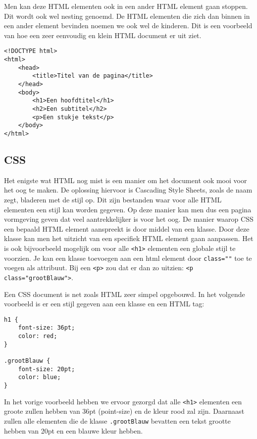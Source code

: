 Men kan deze HTML elementen ook in een ander HTML element gaan stoppen. Dit wordt ook wel nesting genoemd. De HTML elementen die zich dan binnen in een ander element bevinden noemen we ook wel de kinderen. Dit is een voorbeeld van hoe een zeer eenvoudig en klein HTML document er uit ziet.

\begin{lstlisting}[frame=single, caption=Voorbeeld van een HTML bestand]
<!DOCTYPE html>
<html>
	<head>
		<title>Titel van de pagina</title>
	</head>
	<body>
		<h1>Een hoofdtitel</h1>
		<h2>Een subtitel</h2>
		<p>Een stukje tekst</p>
	</body>
</html>
\end{lstlisting}

\subsection{CSS}
Het enigste wat HTML nog mist is een manier om het document ook mooi voor het oog te maken. De oplossing hiervoor is Cascading Style Sheets, zoals de naam zegt, bladeren met de stijl op. Dit zijn bestanden waar voor alle HTML elementen een stijl kan worden gegeven. Op deze manier kan men dus een pagina vormgeving geven dat veel aantrekkelijker is voor het oog. De manier waarop CSS een bepaald HTML element aanspreekt is door middel van een klasse. Door deze klasse kan men het uitzicht van een specifiek HTML element gaan aanpassen. Het is ook bijvoorbeeld mogelijk om voor alle \lstinline[basicstyle=\ttfamily\color{red}]|<h1>| elementen een globale stijl te voorzien. Je kan een klasse toevoegen aan een html element door \lstinline[basicstyle=\ttfamily\color{red}]|class=""| toe te voegen als attribuut. Bij een \lstinline[basicstyle=\ttfamily\color{red}]|<p>| zou dat er dan zo uitzien: \lstinline[basicstyle=\ttfamily\color{red}]|<p class="grootBlauw">|.

Een CSS document is net zoals HTML zeer simpel opgebouwd. In het volgende voorbeeld is er een stijl gegeven aan een klasse en een HTML tag:

\begin{lstlisting}[frame=single, caption=Voorbeeld van een CSS bestand]
h1 {
	font-size: 36pt;
	color: red;
}

.grootBlauw {
	font-size: 20pt;
	color: blue;
}
\end{lstlisting}

In het vorige voorbeeld hebben we ervoor gezorgd dat alle \lstinline[basicstyle=\ttfamily\color{red}]|<h1>| elementen een groote zullen hebben van 36pt (point-size) en de kleur rood zal zijn. Daarnaast zullen alle elementen die de klasse \lstinline[basicstyle=\ttfamily\color{red}]|.grootBlauw| bevatten een tekst grootte hebben van 20pt en een blauwe kleur hebben.

